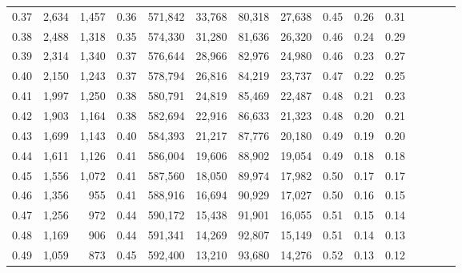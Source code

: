 \begin{tabular}{rrrcrrrrrrrrrrr}
0.37 &   2,634 &  1,457 &                                       0.36 &  571,842 &   33,768 &   80,318 &   27,638 &  0.45 &  0.26 &                         0.31 \\
0.38 &   2,488 &  1,318 &                                       0.35 &  574,330 &   31,280 &   81,636 &   26,320 &  0.46 &  0.24 &                         0.29 \\
0.39 &   2,314 &  1,340 &                                       0.37 &  576,644 &   28,966 &   82,976 &   24,980 &  0.46 &  0.23 &                         0.27 \\
0.40 &   2,150 &  1,243 &                                       0.37 &  578,794 &   26,816 &   84,219 &   23,737 &  0.47 &  0.22 &                         0.25 \\
0.41 &   1,997 &  1,250 &                                       0.38 &  580,791 &   24,819 &   85,469 &   22,487 &  0.48 &  0.21 &                         0.23 \\
0.42 &   1,903 &  1,164 &                                       0.38 &  582,694 &   22,916 &   86,633 &   21,323 &  0.48 &  0.20 &                         0.21 \\
0.43 &   1,699 &  1,143 &                                       0.40 &  584,393 &   21,217 &   87,776 &   20,180 &  0.49 &  0.19 &                         0.20 \\
0.44 &   1,611 &  1,126 &                                       0.41 &  586,004 &   19,606 &   88,902 &   19,054 &  0.49 &  0.18 &                         0.18 \\
0.45 &   1,556 &  1,072 &                                       0.41 &  587,560 &   18,050 &   89,974 &   17,982 &  0.50 &  0.17 &                         0.17 \\
0.46 &   1,356 &    955 &                                       0.41 &  588,916 &   16,694 &   90,929 &   17,027 &  0.50 &  0.16 &                         0.15 \\
0.47 &   1,256 &    972 &                                       0.44 &  590,172 &   15,438 &   91,901 &   16,055 &  0.51 &  0.15 &                         0.14 \\
0.48 &   1,169 &    906 &                                       0.44 &  591,341 &   14,269 &   92,807 &   15,149 &  0.51 &  0.14 &                         0.13 \\
0.49 &   1,059 &    873 &                                       0.45 &  592,400 &   13,210 &   93,680 &   14,276 &  0.52 &  0.13 &                         0.12 \\

\end{tabular}

